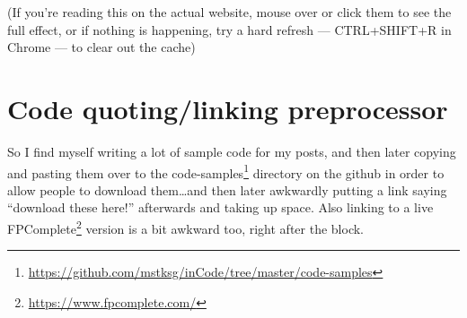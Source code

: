 \documentclass[]{article}
\newenvironment{Shaded}{}{}
\newcommand{\CommentTok}[1]{\textcolor[rgb]{0.38,0.63,0.69}{\textit{#1}}}
\newcommand{\DataTypeTok}[1]{\textcolor[rgb]{0.56,0.13,0.00}{#1}}
\newcommand{\FunctionTok}[1]{\textcolor[rgb]{0.02,0.16,0.49}{#1}}
\newcommand{\KeywordTok}[1]{\textcolor[rgb]{0.00,0.44,0.13}{\textbf{#1}}}
\newcommand{\NormalTok}[1]{#1}
\newcommand{\OperatorTok}[1]{\textcolor[rgb]{0.40,0.40,0.40}{#1}}
\newcommand{\OtherTok}[1]{\textcolor[rgb]{0.00,0.44,0.13}{#1}}
\renewcommand{\href}[2]{#2\footnote{\url{#1}}}
\begin{document}
\begin{Shaded}
\end{Shaded}

(If you're reading this on the actual website, mouse over or click them to see
the full effect, or if nothing is happening, try a hard refresh --- CTRL+SHIFT+R
in Chrome --- to clear out the cache)

\section{Code quoting/linking
preprocessor}\label{code-quotinglinking-preprocessor}

So I find myself writing a lot of sample code for my posts, and then later
copying and pasting them over to the
\href{https://github.com/mstksg/inCode/tree/master/code-samples}{code-samples}
directory on the github in order to allow people to download them\ldots and then
later awkwardly putting a link saying ``download these here!'' afterwards and
taking up space. Also linking to a live
\href{https://www.fpcomplete.com/}{FPComplete} version is a bit awkward too,
right after the block.
\end{document}
